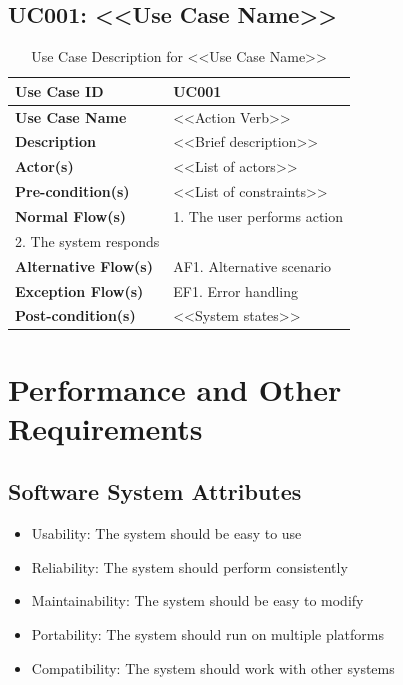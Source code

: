 \documentclass[oneside]{utmsrs}
\begin{document}
\subsection{UC001: <<Use Case Name>>}
\begin{table}[h]
\centering
\begin{tabular}{|p{}|p{}|}
\hline
\textbf{Use Case ID} & UC001 \\ \hline
\textbf{Use Case Name} & <<Action Verb>> \\ \hline
\textbf{Description} & <<Brief description>> \\ \hline
\textbf{Actor(s)} & <<List of actors>> \\ \hline
\textbf{Pre-condition(s)} & <<List of constraints>> \\ \hline
\textbf{Normal Flow(s)} & 
1. The user performs action \\
2. The system responds \\ \hline
\textbf{Alternative Flow(s)} & AF1. Alternative scenario \\ \hline
\textbf{Exception Flow(s)} & EF1. Error handling \\ \hline
\textbf{Post-condition(s)} & <<System states>> \\ \hline
\end{tabular}
\caption{Use Case Description for <<Use Case Name>>}
\label{tab:uc001}
\end{table}



\section{Performance and Other Requirements}
\subsection{Software System Attributes}
\begin{itemize}
    \item Usability: The system should be easy to use
    \item Reliability: The system should perform consistently
    \item Maintainability: The system should be easy to modify
    \item Portability: The system should run on multiple platforms
    \item Compatibility: The system should work with other systems
\end{itemize}
\end{document}
